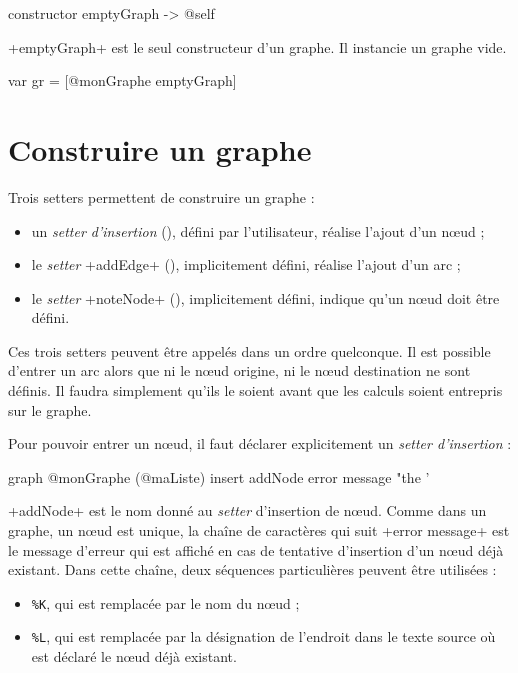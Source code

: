 \begin{galgas}
constructor emptyGraph -> @self
\end{galgas}

\ggs+emptyGraph+ est le seul constructeur d'un graphe. Il instancie un graphe vide.

\begin{galgas}
var gr = [@monGraphe emptyGraph] 
\end{galgas}



\section{Construire un graphe}

Trois setters permettent de construire un graphe :
\begin{itemize}
  \item un \emph{setter d'insertion} (), défini par l'utilisateur, réalise l'ajout d'un nœud ;
  \item le \emph{setter} \ggs+addEdge+ (), implicitement défini, réalise l'ajout d'un arc ;
  \item le \emph{setter} \ggs+noteNode+ (), implicitement défini, indique qu'un nœud doit être défini.
\end{itemize}

Ces trois setters peuvent être appelés dans un ordre quelconque. Il est possible d'entrer un arc alors que ni le nœud origine, ni le nœud destination ne sont définis. Il faudra simplement qu'ils le soient avant que les calculs soient entrepris sur le graphe.


Pour pouvoir entrer un nœud, il faut déclarer explicitement un \emph{setter d'insertion} :
\begin{galgas}
graph @monGraphe (@maListe) {
  insert addNode error message "the '%
}
\end{galgas}

\ggs+addNode+ est le nom donné au \emph{setter} d'insertion de nœud. Comme dans un graphe, un nœud est unique, la chaîne de caractères qui suit \ggs+error message+ est le message d'erreur qui est affiché en cas de tentative d'insertion d'un nœud déjà existant. Dans cette chaîne, deux séquences particulières peuvent être utilisées :
\begin{itemize}
  \item \texttt{\%K}, qui est remplacée par le nom du nœud ;
  \item \texttt{\%L}, qui est remplacée par la désignation de l'endroit dans le texte source où est déclaré le nœud déjà existant.
\end{itemize}

